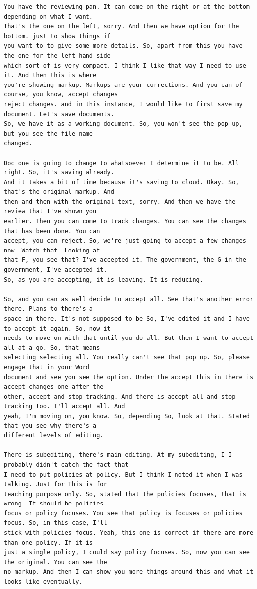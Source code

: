 {\begin{Verbatim}
You have the reviewing pan. It can come on the right or at the bottom depending on what I want.
That's the one on the left, sorry. And then we have option for the bottom. just to show things if
you want to to give some more details. So, apart from this you have the one for the left hand side
which sort of is very compact. I think I like that way I need to use it. And then this is where
you're showing markup. Markups are your corrections. And you can of course, you know, accept changes
reject changes. and in this instance, I would like to first save my document. Let's save documents.
So, we have it as a working document. So, you won't see the pop up, but you see the file name
changed.

Doc one is going to change to whatsoever I determine it to be. All right. So, it's saving already.
And it takes a bit of time because it's saving to cloud. Okay. So, that's the original markup. And
then and then with the original text, sorry. And then we have the review that I've shown you
earlier. Then you can come to track changes. You can see the changes that has been done. You can
accept, you can reject. So, we're just going to accept a few changes now. Watch that. Looking at
that F, you see that? I've accepted it. The government, the G in the government, I've accepted it.
So, as you are accepting, it is leaving. It is reducing.

So, and you can as well decide to accept all. See that's another error there. Plans to there's a
space in there. It's not supposed to be So, I've edited it and I have to accept it again. So, now it
needs to move on with that until you do all. But then I want to accept all at a go. So, that means
selecting selecting all. You really can't see that pop up. So, please engage that in your Word
document and see you see the option. Under the accept this in there is accept changes one after the
other, accept and stop tracking. And there is accept all and stop tracking too. I'll accept all. And
yeah, I'm moving on, you know. So, depending So, look at that. Stated that you see why there's a
different levels of editing.

There is subediting, there's main editing. At my subediting, I I probably didn't catch the fact that
I need to put policies at policy. But I think I noted it when I was talking. Just for This is for
teaching purpose only. So, stated that the policies focuses, that is wrong. It should be policies
focus or policy focuses. You see that policy is focuses or policies focus. So, in this case, I'll
stick with policies focus. Yeah, this one is correct if there are more than one policy. If it is
just a single policy, I could say policy focuses. So, now you can see the original. You can see the
no markup. And then I can show you more things around this and what it looks like eventually.


\end{Verbatim}}

